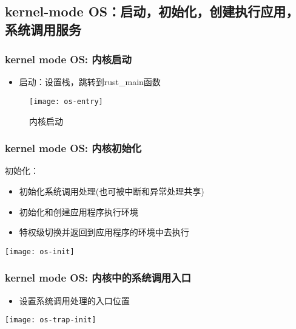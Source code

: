 \subsection{kernel-mode OS：启动，初始化，创建执行应用，系统调用服务}
\begin{frame}
    \frametitle{kernel mode OS: 内核启动}
    \begin{itemize}
        
        \item 启动：设置栈，跳转到rust\_main函数
        
    \end{itemize}	
    \begin{figure}
        \centering
        \texttt{[image: os-entry]}
        \caption{内核启动}
    \end{figure}
\end{frame}

\begin{frame}
    \frametitle{kernel mode OS: 内核初始化}
    初始化：
    \begin{itemize}
        
        \item 初始化系统调用处理(也可被中断和异常处理共享)
        \item 初始化和创建应用程序执行环境
        \item 特权级切换并返回到应用程序的环境中去执行
        
    \end{itemize}	
        \centering
        \texttt{[image: os-init]}
\end{frame}

\begin{frame}
    \frametitle{kernel mode OS: 内核中的系统调用入口}
    
    \begin{itemize}
        
        \item 设置系统调用处理的入口位置

        
    \end{itemize}	
    \centering
    \texttt{[image: os-trap-init]}
\end{frame}


